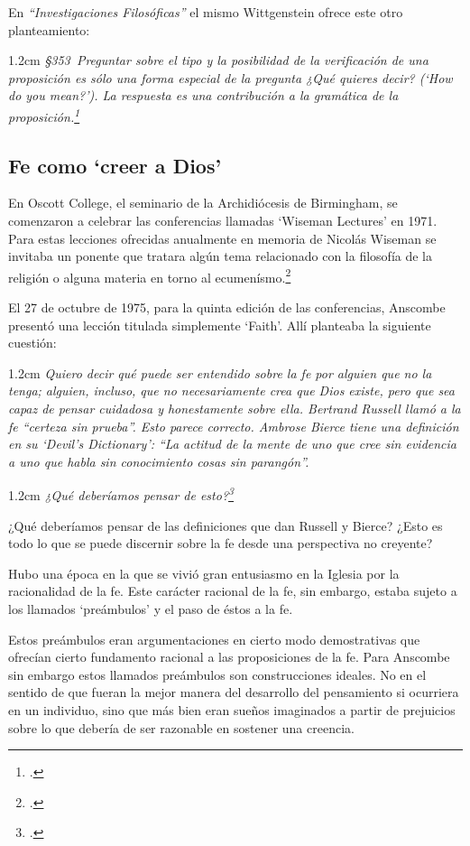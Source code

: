 \documentclass[10pt]{article}
\newcommand{\citalitlar}[1]{
\begin{adjustwidth}{1.2cm}{}
\emph{#1}
\end{adjustwidth}
}
\begin{document}
En \emph{``Investigaciones Filosóficas''} el mismo Wittgenstein ofrece este otro
planteamiento: 
\citalitlar{\S353~Preguntar sobre el tipo y la posibilidad de la verificación de
  una proposición es sólo una forma especial de la pregunta ¿Qué quieres decir?
  (`How do you mean?'). La respuesta es una contribución a la gramática de la
  proposición.\footcite{PI}}

\subsection{Fe como `creer a Dios'}
En Oscott College, el seminario de la Archidiócesis de Birmingham, se
  comenzaron a celebrar las conferencias llamadas `Wiseman Lectures'
  en 1971. Para estas lecciones ofrecidas anualmente en memoria de Nicolás
  Wiseman se invitaba un ponente que tratara algún tema relacionado con la
  filosofía de la religión o alguna materia en torno al
  ecumenísmo.\footcite[cf.~][p.~7]{wisemanlects}

  El 27 de octubre de 1975, para la quinta edición de las conferencias, Anscombe
  presentó una lección titulada simplemente `Faith'. Allí planteaba la
  siguiente cuestión:\citalitlar{Quiero decir qué puede ser entendido sobre la
  fe por alguien que no la tenga; alguien, incluso, que no necesariamente crea
  que Dios existe, pero que sea capaz de pensar cuidadosa y honestamente sobre
  ella. Bertrand Russell llamó a la fe ``certeza sin prueba''. Esto parece
  correcto. Ambrose Bierce tiene una definición en su `Devil's
  Dictionary': ``La actitud de la mente de uno que cree sin evidencia a uno que
  habla sin conocimiento cosas sin parangón''.} \citalitlar{¿Qué deberíamos
  pensar de esto?\footcite[p.~115]{faith}} 

¿Qué deberíamos pensar de las definiciones que dan Russell y Bierce? ¿Esto es
todo lo que se puede discernir sobre la fe desde una perspectiva no creyente?

Hubo una época en la que se vivió gran entusiasmo en la Iglesia por la
racionalidad de la fe. Este carácter racional de la fe, sin embargo, estaba
sujeto a los llamados `preámbulos' y el paso de éstos a la fe.

Estos preámbulos eran argumentaciones en cierto modo demostrativas que
ofrecían cierto fundamento racional a las proposiciones de la fe. Para
Anscombe sin embargo estos llamados preámbulos son construcciones ideales.
No en el sentido de que fueran la mejor manera del desarrollo del
pensamiento si ocurriera en un individuo, sino que más bien eran sueños
imaginados a partir de prejuicios sobre lo que debería de ser razonable en
sostener una creencia.
\end{document}
